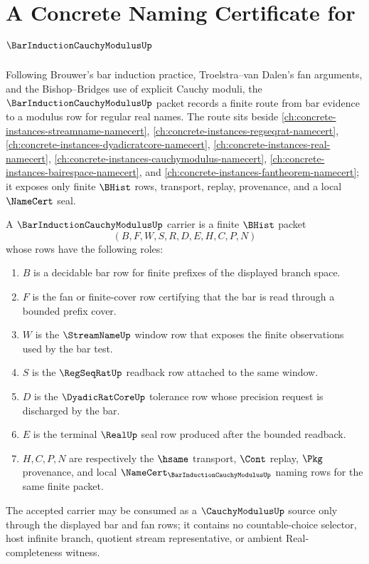 \chapter{A Concrete Naming Certificate for $\BarInductionCauchyModulusUp$}
\label{ch:concrete-instances-bar-induction-cauchy-modulus-namecert}

Following Brouwer's bar induction practice, Troelstra--van Dalen's fan arguments, and the Bishop--Bridges use of explicit Cauchy moduli, the $\BarInductionCauchyModulusUp$ packet records a finite route from bar evidence to a modulus row for regular real names. The route sits beside \autoref{ch:concrete-instances-streamname-namecert}, \autoref{ch:concrete-instances-regseqrat-namecert}, \autoref{ch:concrete-instances-dyadicratcore-namecert}, \autoref{ch:concrete-instances-real-namecert}, \autoref{ch:concrete-instances-cauchymodulus-namecert}, \autoref{ch:concrete-instances-bairespace-namecert}, and \autoref{ch:concrete-instances-fantheorem-namecert}; it exposes only finite $\BHist$ rows, transport, replay, provenance, and a local $\NameCert$ seal.

\begin{definition}
\label{def:bar-induction-cauchy-modulus-carrier}
A $\BarInductionCauchyModulusUp$ carrier is a finite $\BHist$ packet
$$
(B,F,W,S,R,D,E,H,C,P,N)
$$
whose rows have the following roles:
\begin{enumerate}
\item $B$ is a decidable bar row for finite prefixes of the displayed branch space.
\item $F$ is the fan or finite-cover row certifying that the bar is read through a bounded prefix cover.
\item $W$ is the $\StreamNameUp$ window row that exposes the finite observations used by the bar test.
\item $S$ is the $\RegSeqRatUp$ readback row attached to the same window.
\item $D$ is the $\DyadicRatCoreUp$ tolerance row whose precision request is discharged by the bar.
\item $E$ is the terminal $\RealUp$ seal row produced after the bounded readback.
\item $H,C,P,N$ are respectively the $\hsame$ transport, $\Cont$ replay, $\Pkg$ provenance, and local $\NameCert_{\BarInductionCauchyModulusUp}$ naming rows for the same finite packet.
\end{enumerate}
The accepted carrier may be consumed as a $\CauchyModulusUp$ source only through the displayed bar and fan rows; it contains no countable-choice selector, host infinite branch, quotient stream representative, or ambient Real-completeness witness.
\end{definition}

